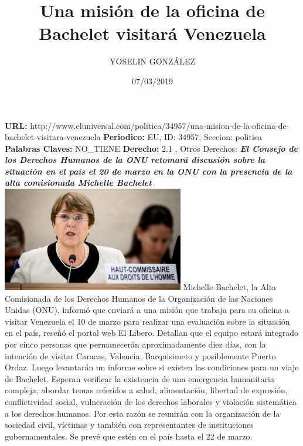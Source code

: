 \documentclass{article}%
\title{\textbf{Una misión de la oficina de Bachelet visitará Venezuela}}%
\author{YOSELIN GONZÁLEZ}%
\date{07/03/2019}%
\begin{document}
%
\normalsize%
\maketitle%
\textbf{URL: }%
http://www.eluniversal.com/politica/34957/una{-}mision{-}de{-}la{-}oficina{-}de{-}bachelet{-}visitara{-}venezuela\newline%
%
\textbf{Periodico: }%
EU, %
ID: %
34957, %
Seccion: %
politica\newline%
%
\textbf{Palabras Claves: }%
NO\_TIENE\newline%
%
\textbf{Derecho: }%
2.1%
, Otros Derechos: %
\newline%
%
\textbf{\textit{El Consejo de los Derechos Humanos de la ONU retomará discusión sobre la situación en el país el 20 de marzo en la ONU con la presencia de la alta comisionada Michelle Bachelet}}%
\newline%
\newline%
%
\includegraphics[width=300px]{EU_34957.jpeg}%
\newline%
%
Michelle Bachelet, la Alta Comisionada de los Derechos Humanos de la Organización de las Naciones Unidas (ONU), informó que enviará a una misión que trabaja para su oficina a visitar Venezuela el 10 de marzo para realizar una evaluación sobre la situación en el país, reseñó el portal web El Libero.%
\newline%
%
Detallan que el equipo estará integrado por cinco personas que permanecerán aproximadamente diez días, con la intención de visitar Caracas, Valencia, Barquisimeto y posiblemente Puerto Ordaz. Luego levantarán un informe sobre si existen las condiciones para un viaje de Bachelet.%
\newline%
%
Esperan verificar la existencia de una emergencia humanitaria compleja, abordar temas referidos a salud, alimentación, libertad de expresión, conflictividad social, vulneración de los derechos laborales y violación sistemática a los derechos humanos. Por esta razón se reunirán con la organización de la sociedad civil, víctimas y también con representantes de instituciones gubernamentales.  Se prevé que estén en el país hasta el 22 de marzo.%
\end{document}
